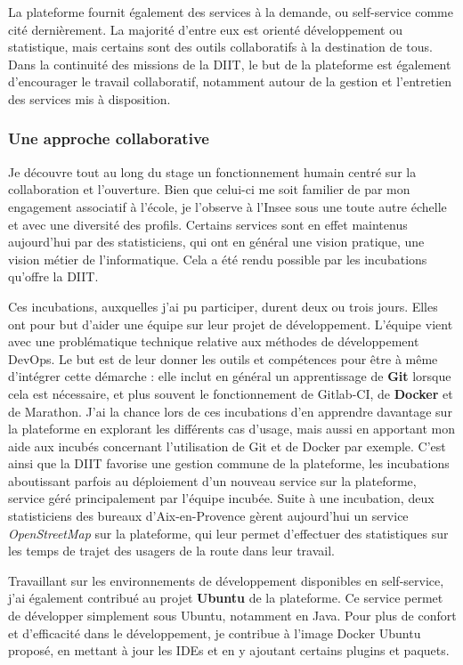 La plateforme fournit également des services à la demande, ou self-service comme cité dernièrement. La majorité d'entre eux est orienté développement ou statistique, mais certains sont des outils collaboratifs à la destination de tous. Dans la continuité des missions de la DIIT, le but de la plateforme est également d'encourager le travail collaboratif, notamment autour de la gestion et l'entretien des services mis à disposition.

\subsubsection{Une approche collaborative}
Je découvre tout au long du stage un fonctionnement humain centré sur la collaboration et l'ouverture. Bien que celui-ci me soit familier de par mon engagement associatif à l'école, je l'observe à l'Insee sous une toute autre échelle et avec une diversité des profils. Certains services sont en effet maintenus aujourd'hui par des statisticiens, qui ont en général une vision pratique, une vision métier de l'informatique. Cela a été rendu possible par les incubations qu'offre la DIIT.
\newline

Ces incubations, auxquelles j'ai pu participer, durent deux ou trois jours. Elles ont pour but d'aider une équipe sur leur projet de développement. L'équipe vient avec une problématique technique relative aux méthodes de développement DevOps. Le but est de leur donner les outils et compétences pour être à même d'intégrer cette démarche : elle inclut en général un apprentissage de \textbf{Git} lorsque cela est nécessaire, et plus souvent le fonctionnement de Gitlab-CI, de \textbf{Docker} et de Marathon. J'ai la chance lors de ces incubations d'en apprendre davantage sur la plateforme en explorant les différents cas d'usage, mais aussi en apportant mon aide aux incubés concernant l'utilisation de Git et de Docker par exemple. C'est ainsi que la DIIT favorise une gestion commune de la plateforme, les incubations aboutissant parfois au déploiement d'un nouveau service sur la plateforme, service géré principalement par l'équipe incubée. Suite à une incubation, deux statisticiens des bureaux d'Aix-en-Provence gèrent aujourd'hui un service \textit{OpenStreetMap} sur la plateforme, qui leur permet d'effectuer des statistiques sur les temps de trajet des usagers de la route dans leur travail. 
\newline

Travaillant sur les environnements de développement disponibles en self-service, j'ai également contribué au projet \textbf{Ubuntu} de la plateforme. Ce service permet de développer simplement sous Ubuntu, notamment en Java. Pour plus de confort et d'efficacité dans le développement, je contribue à l'image Docker Ubuntu proposé, en mettant à jour les IDEs et en y ajoutant certains plugins et paquets.
\label{section 2.2.2}

